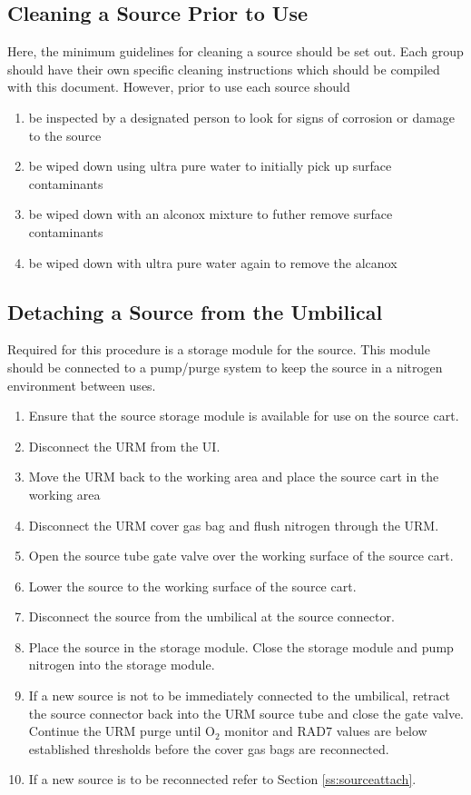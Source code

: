 \begin{}
\subsection{Cleaning a Source Prior to Use}
Here, the minimum guidelines for cleaning a source should be set out. Each group should have their own specific cleaning instructions which should be compiled with this document. However, prior to use each source should
\begin{enumerate}
\item be inspected by a designated person to look for signs of corrosion or damage to the source
\item be wiped down using ultra pure water to initially pick up surface contaminants
\item be wiped down with an alconox mixture to futher remove surface contaminants
\item be wiped down with ultra pure water again to remove the alcanox
\end{enumerate}

\subsection{Detaching a Source from the Umbilical}
Required for this procedure is a storage module for the source. This module should be connected to a pump/purge system to keep the source in a nitrogen environment between uses.
\begin{enumerate}
\item Ensure that the source storage module is available for use on the source cart.
\item Disconnect the URM from the UI.
\item Move the URM back to the working area and place the source cart in the working area
\item Disconnect the URM cover gas bag and flush nitrogen through the URM.
\item Open the source tube gate valve over the working surface of the source cart.
\item Lower the source to the working surface of the source cart.
\item Disconnect the source from the umbilical at the source connector.
\item Place the source in the storage module. Close the storage module and pump nitrogen into the storage module.
\item If a new source is not to be immediately connected to the umbilical, retract the source connector back into the URM source tube and close the gate valve. Continue the URM purge until O$_{2}$ monitor and RAD7 values are below established thresholds before the cover gas bags are reconnected. 
\item If a new source is to be reconnected refer to Section \ref{ss:sourceattach}.
\end{enumerate}


\end{}
